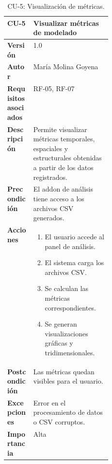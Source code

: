 \begin{table}[p]
\centering
\begin{tabularx}{\linewidth}{p{0.25\linewidth} X}
\toprule
\textbf{CU-5} & Visualizar métricas de modelado \\
\midrule
\textbf{Versión} & 1.0 \\
\textbf{Autor} & María Molina Goyena \\
\textbf{Requisitos asociados} & RF-05, RF-07 \\
\textbf{Descripción} & Permite visualizar métricas temporales, espaciales y estructurales obtenidas a partir de los datos registrados. \\
\textbf{Precondición} & El addon de análisis tiene acceso a los archivos CSV generados. \\
\textbf{Acciones} &
\begin{minipage}[t]{\linewidth}
\begin{enumerate}
    \item El usuario accede al panel de análisis.
    \item El sistema carga los archivos CSV.
    \item Se calculan las métricas correspondientes.
    \item Se generan visualizaciones gráficas y tridimensionales.
\end{enumerate}
\end{minipage} \\
\textbf{Postcondición} & Las métricas quedan visibles para el usuario. \\
\textbf{Excepciones} & Error en el procesamiento de datos o CSV corruptos. \\
\textbf{Importancia} & Alta \\
\bottomrule
\end{tabularx}
\caption{CU-5: Visualización de métricas.}
\label{tab:cu5}
\end{table}

